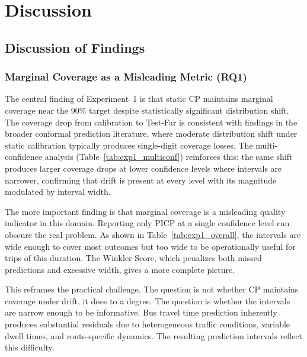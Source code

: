 \documentclass[12pt, a4paper, oneside]{report}
\begin{document}

\chapter{Discussion}
\label{ch:discussion}



\section{Discussion of Findings}
\label{sec:discussion_findings}

\subsection{Marginal Coverage as a Misleading Metric (RQ1)}

The central finding of Experiment~1 is that static CP maintains marginal coverage near the 90\% target despite statistically significant distribution shift. The coverage drop from calibration to Test-Far is consistent with findings in the broader conformal prediction literature, where moderate distribution shift under static calibration typically produces single-digit coverage losses. The multi-confidence analysis (Table~\ref{tab:exp1_multiconf}) reinforces this: the same shift produces larger coverage drops at lower confidence levels where intervals are narrower, confirming that drift is present at every level with its magnitude modulated by interval width.

The more important finding is that marginal coverage is a misleading quality indicator in this domain. Reporting only PICP at a single confidence level can obscure the real problem. As shown in Table~\ref{tab:exp1_overall}, the intervals are wide enough to cover most outcomes but too wide to be operationally useful for trips of this duration. The Winkler Score, which penalizes both missed predictions and excessive width, gives a more complete picture.

This reframes the practical challenge. The question is not whether CP maintains coverage under drift, it does to a degree. The question is whether the intervals are narrow enough to be informative. Bus travel time prediction inherently produces substantial residuals due to heterogeneous traffic conditions, variable dwell times, and route-specific dynamics. The resulting prediction intervals reflect this difficulty.
\end{document}

